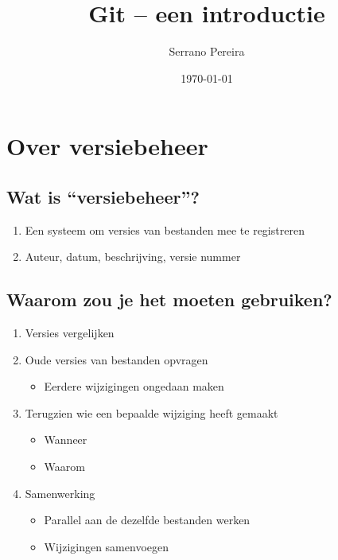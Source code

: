 \documentclass[]{beamer}
\title[Git]
{Git -- een introductie}
\author{Serrano Pereira}
\institute
{
  \inst{}
  Computest, Zoetermeer
}
\date{\today}
\begin{document}
\frame{\titlepage}
\note{}

\begin{frame}
\tableofcontents
\end{frame}

\section{Over versiebeheer}

\subsection{Wat is ``versiebeheer''?}

\begin{frame}
    \begin{enumerate}
        \item Een systeem om versies van bestanden mee te registreren
        \item Auteur, datum, beschrijving, versie nummer
    \end{enumerate}
\end{frame}

\subsection{Waarom zou je het moeten gebruiken?}

\begin{frame}
    \begin{enumerate}
    \item Versies vergelijken
    \item Oude versies van bestanden opvragen
        \begin{itemize}
            \item Eerdere wijzigingen ongedaan maken
        \end{itemize}
    \item Terugzien wie een bepaalde wijziging heeft gemaakt
        \begin{itemize}
            \item Wanneer
            \item Waarom
        \end{itemize}
    \item Samenwerking
        \begin{itemize}
            \item Parallel aan de dezelfde bestanden werken
            \item Wijzigingen samenvoegen
        \end{itemize}
    \end{enumerate}
\end{frame}
\end{document}

